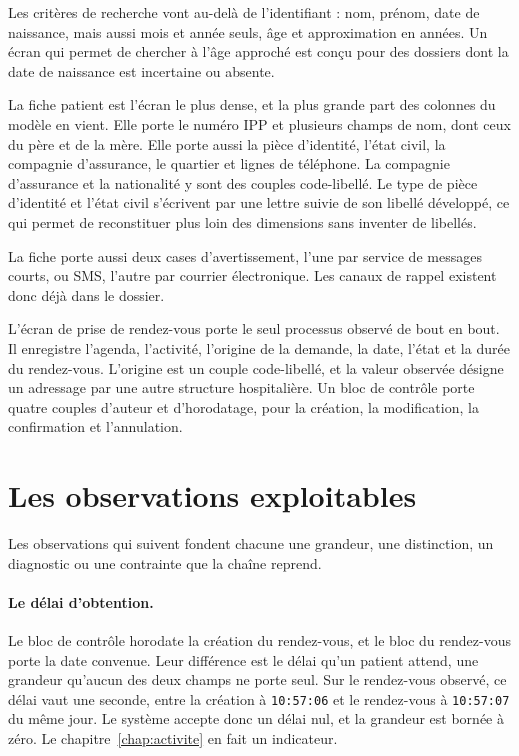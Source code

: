 Les critères de recherche vont au-delà de l'identifiant : nom, prénom, date de naissance, mais aussi
mois et année seuls, âge et approximation en années. Un écran qui permet de chercher à l'âge approché
est conçu pour des dossiers dont la date de naissance est incertaine ou absente.

La fiche patient est l'écran le plus dense, et la plus grande part des colonnes du modèle en vient.
Elle porte le numéro IPP et plusieurs champs de nom, dont ceux du père et de la
mère. Elle porte aussi la pièce d'identité, l'état civil, la compagnie d'assurance, le quartier et
 lignes de téléphone. La compagnie d'assurance et la nationalité y sont des
couples code-libellé. Le type de pièce d'identité et l'état civil s'écrivent par une lettre suivie
de son libellé développé, ce qui permet de reconstituer plus loin des dimensions
sans inventer de libellés.

La fiche porte aussi deux cases d'avertissement, l'une par service de messages courts, ou SMS,
l'autre par courrier électronique. Les canaux de rappel existent donc déjà dans
le dossier.

L'écran de prise de rendez-vous porte le seul processus observé de bout en bout. Il enregistre
l'agenda, l'activité, l'origine de la demande, la date, l'état et la durée du
rendez-vous. L'origine est un couple code-libellé, et la valeur observée désigne
un adressage par une autre structure hospitalière. Un bloc de contrôle porte
quatre couples d'auteur et d'horodatage, pour la création, la modification, la confirmation et
l'annulation.

\section{Les observations exploitables}

Les observations qui suivent fondent chacune une grandeur, une distinction, un diagnostic ou une
contrainte que la chaîne reprend.

\paragraph{Le délai d'obtention.} Le bloc de contrôle horodate la création du
rendez-vous, et le bloc du rendez-vous porte la date convenue. Leur différence
est le délai qu'un patient attend, une grandeur qu'aucun des deux champs ne porte seul. Sur le
rendez-vous observé, ce délai vaut une seconde, entre la création à \texttt{10:57:06} et le
rendez-vous à \texttt{10:57:07} du même jour. Le système accepte donc un délai nul, et la grandeur
est bornée à zéro. Le chapitre~\ref{chap:activite} en fait un indicateur.

